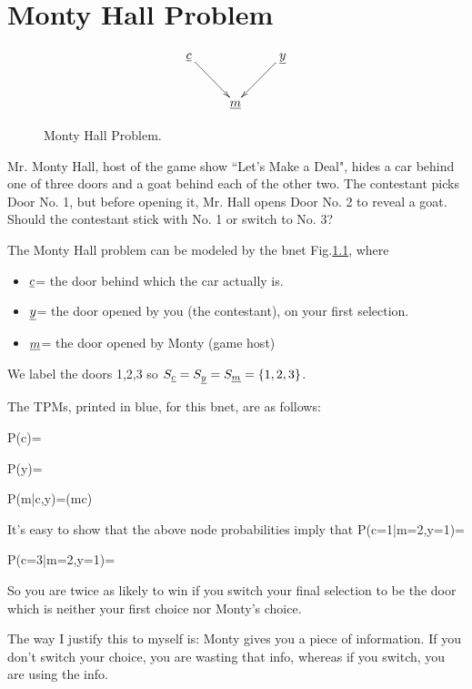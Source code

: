 \chapter{Monty Hall Problem}
\begin{figure}[h!]
\centering
$$\xymatrix{
\rvc\ar[dr]&&\rvy\ar[dl]\\
&\rvm&
}$$
\caption{Monty Hall Problem.}
\label{fig-monty}
\end{figure}

Mr. Monty Hall, host of the 
game show ``Let’s Make a Deal",
 hides a car behind one of 
three doors and a goat 
behind each of the other two.
 The contestant picks Door No. 1,
 but before opening it, Mr. Hall 
opens Door No. 2 to reveal a goat. 
Should the contestant stick with No. 1 
or 
switch to No. 3?

The Monty Hall problem can be 
modeled by the bnet 
Fig.\ref{fig-monty}, where
\begin{itemize}
\item
${\underline{c}}$= the door behind which the car actually is.
\item
${\underline{y}}$= the door opened by you
 (the contestant), on your 
first selection.
\item
${\underline{m}}$= the door opened by Monty (game host)
\end{itemize}

We label the doors 1,2,3 so
 $S_{\underline{c}}=S_{\underline{y}}=S_{\underline{m}}=\{1,2,3\}$.

The TPMs, printed in blue,
for this bnet, are as follows:

\beq\color{blue}
P(c)=
\eeq

\beq\color{blue}
P(y)=
\eeq

\beq\color{blue}
P(m|c,y)=\indi(m\neq c)\left[
\frac{1}{2}\indi(y=c)
+
\indi(y\neq c)\indi(m\neq y)\right]
\eeq

It's easy to show that the above
 node probabilities imply that
\beq
P(c=1|m=2,y=1)=
\eeq

\beq
P(c=3|m=2,y=1)=
\eeq

So you are twice as likely to
 win if you switch your final
 selection to be the door 
which is neither 
your first choice nor Monty's choice.

The way I justify this to myself
is: Monty gives you a
 piece of information.
If you don't switch your choice,
you are wasting that info, whereas
if you switch, you are using the info.


